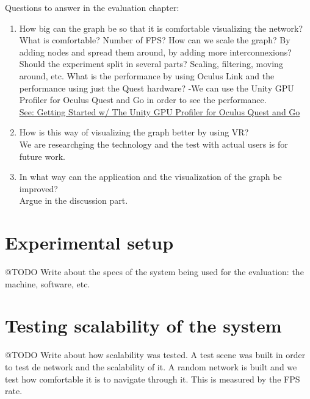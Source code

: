 Questions to answer in the evaluation chapter:


\begin{enumerate}
  \item{How big can the graph be so that it is comfortable visualizing the network?}\\
  What is comfortable? Number of FPS?
  How can we scale the graph? By adding nodes and spread them around, by adding more interconnexions?
  Should the experiment split in several parts? Scaling, filtering, moving around, etc.
  What is the performance by using Oculus Link and the performance using just the Quest hardware?
  -We can use the Unity GPU Profiler for Oculus Quest and Go in order to see the performance.\\
  \href{https://developer.oculus.com/blog/getting-started-w-the-unity-gpu-profiler-for-oculus-quest-and-go/}{See: Getting Started w/ The Unity GPU Profiler for Oculus Quest and Go}
  \item{How is this way of visualizing the graph better by using VR?}\\
  We are researchging the technology and the test with actual users is for future work.
  \item{In what way can the application and the visualization of the graph be improved?}\\
  Argue in the discussion part.
\end{enumerate}


\section{Experimental setup}
@TODO Write about the specs of the system being used for the evaluation: the machine, software, etc.

\section{Testing scalability of the system}
@TODO Write about how scalability was tested.
A test scene was built in order to test de network and the scalability of it. A random network is built and we test how comfortable it is to navigate through it. This is measured by the FPS rate.
